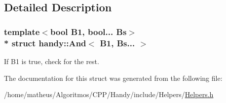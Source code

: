 \subsection{Detailed Description}
\subsubsection*{template$<$bool B1, bool... Bs$>$\\*
struct handy\+::\+And$<$ B1, Bs... $>$}

If {\ttfamily B1} is true, check for the rest. 

The documentation for this struct was generated from the following file\+:\begin{DoxyCompactItemize}
\item 
/home/matheus/\+Algoritmos/\+C\+P\+P/\+Handy/include/\+Helpers/\hyperlink{Helpers_2Helpers_8h}{Helpers.\+h}\end{DoxyCompactItemize}
